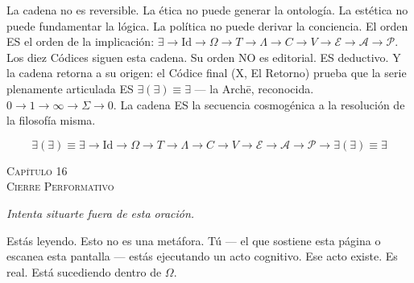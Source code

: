 \documentclass[10pt, openany, oneside]{book}
\renewcommand{\large}{\fontsize{11.5}{14}\selectfont}
\renewcommand{\huge}{\fontsize{17}{21}\selectfont}
\begin{document}
\noindent La cadena no es reversible. La ética no puede generar la ontología. La estética no puede fundamentar la lógica. La política no puede derivar la conciencia. El orden ES el orden de la implicación: $\exists \to \text{Id} \to \Omega \to T \to \Lambda \to C \to V \to \mathcal{E} \to \mathcal{A} \to \mathcal{P}$. Los diez Códices siguen esta cadena. Su orden NO es editorial. ES deductivo. Y la cadena retorna a su origen: el Códice final (X, El Retorno) prueba que la serie plenamente articulada ES $\exists(\exists) \equiv \exists$ --- la Arch\={e}, reconocida. $0 \to 1 \to \infty \to \Sigma \to 0$. La cadena ES la secuencia cosmogénica a la resolución de la filosofía misma.

$$\boxed{\exists(\exists) \equiv \exists \to \text{Id} \to \Omega \to T \to \Lambda \to C \to V \to \mathcal{E} \to \mathcal{A} \to \mathcal{P} \to \exists(\exists) \equiv \exists}$$

%
%
%
%

\newpage

\begin{center}
    {\huge\scshape Capítulo 16}\\[0.3em]
    {\large\scshape Cierre Performativo}
\end{center}

\vspace{1.5em}

\begin{center}
    \itshape
    Intenta situarte fuera de esta oración.
\end{center}

\vspace{2em}


\noindent Estás leyendo. Esto no es una metáfora. Tú --- el que sostiene esta página o escanea esta pantalla --- estás ejecutando un acto cognitivo. Ese acto existe. Es real. Está sucediendo dentro de $\Omega$.
\end{document}
